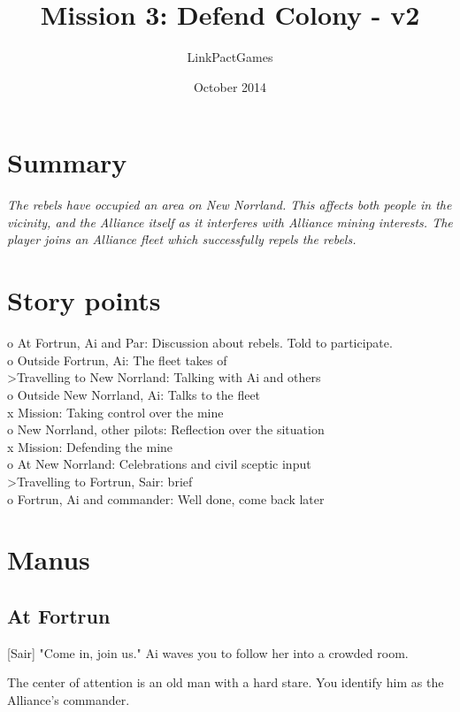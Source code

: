\documentclass[a4paper,12pt]{article}
\begin{document}
\title{Mission 3: Defend Colony - v2}
\author{LinkPactGames}
\date{October 2014}
\maketitle

\section{Summary}
\textit{The rebels have occupied an area on New Norrland. This affects both people in
the vicinity, and the Alliance itself as it interferes with Alliance
mining interests. The player joins an Alliance fleet which successfully
repels the rebels.}

\section{Story points}

o At Fortrun, Ai and Par: Discussion about rebels. Told to participate.\\
o Outside Fortrun, Ai: The fleet takes of\\
\textgreater Travelling to New Norrland: Talking with Ai and others\\
o Outside New Norrland, Ai: Talks to the fleet\\
x Mission: Taking control over the mine\\
o New Norrland, other pilots: Reflection over the situation\\
x Mission: Defending the mine\\
o At New Norrland: Celebrations and civil sceptic input\\
\textgreater Travelling to Fortrun, Sair: brief\\
o Fortrun, Ai and commander: Well done, come back later

\section{Manus}

\subsection{At Fortrun}

[Sair] "Come in, join us." Ai waves you to follow her into a crowded room.

The center of attention is an old man with a hard stare. You identify him
as the Alliance's commander.
\end{document}
